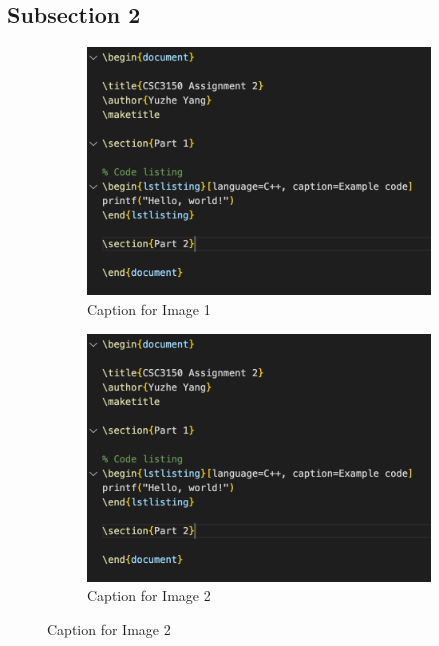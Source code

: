 \documentclass[12pt,a4paper]{report}
\begin{document}
\subsection{Subsection 2}
\begin{figure}[h]
    \centering

    \begin{subfigure}{0.4\textwidth}
        \centering
        \includegraphics[width=\textwidth]{src/example.png}
        \caption{Caption for Image 1}
    \end{subfigure}
    \hfill
    \begin{subfigure}{0.4\textwidth}
        \centering
        \includegraphics[width=\textwidth]{src/example.png}
        \caption{Caption for Image 2}
    \end{subfigure}


\end{figure}
\end{document}
